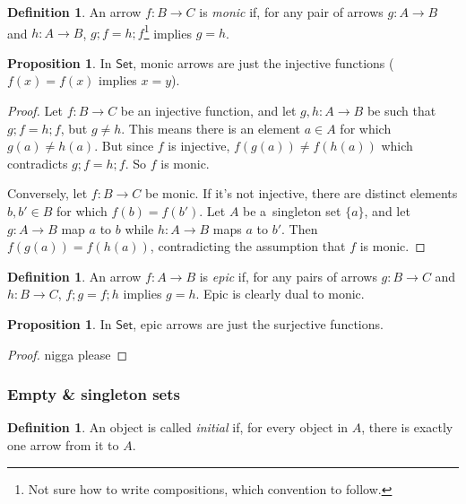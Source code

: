 \documentclass{amsart}
\theoremstyle{definition}
\newtheorem{definition}[thm]{Definition}
\newtheorem{proposition}[thm]{Proposition}
\newcommand{\cat}[1]{\mathsf{#1}} %
\begin{document}
\begin{definition}
An arrow $f: B \to C$ is \emph{monic} if, for any pair of arrows $g: A\to B$ and $h: A\to B$, $g;\! f = h;\! f$\footnote{Not sure how to write compositions, which convention to follow. } implies $g=h$.
\end{definition}

\begin{proposition}
In $\cat{Set}$, monic arrows are just the injective functions ($f(x) = f(x)$ implies $x=y$). 
\end{proposition}

\begin{proof}
  Let $f: B\to C$ be an injective function, and let $g,h: A\to B$ be such that $g;\! f = h;\! f$, but $g\neq h$. This means there is an element $a\in A$ for which $g(a) \neq h(a)$. But since $f$ is injective, $f(g(a))\neq f(h(a))$ which contradicts $g;\! f = h;\! f$. So $f$ is monic.

  Conversely, let $f: B \to C$ be monic. If it's not injective, there are distinct elements $b, b' \in B$ for which $f(b) = f(b')$. Let $A$ be a~singleton set $\{a\}$, and let $g: A\to B$ map $a$ to $b$ while $h: A\to B$ maps $a$ to $b'$. Then $f(g(a)) = f(h(a))$, contradicting the assumption that $f$ is monic. 
\end{proof}

\begin{definition}
An arrow $f: A\to B$ is \emph{epic} if, for any pairs of arrows $g: B\to C$ and $h: B\to C$, $f;\! g = f;\! h$ implies $g=h$. Epic is clearly dual to monic. 
\end{definition}

\begin{proposition}
In $\cat{Set}$, epic arrows are just the surjective functions. 
\end{proposition}

\begin{proof}
  nigga please
\end{proof}

\subsubsection{Empty \& singleton sets}

\begin{definition}
An object is called \emph{initial} if, for every object in $A$, there is exactly one arrow from it to $A$. 
\end{definition}
\end{document}
